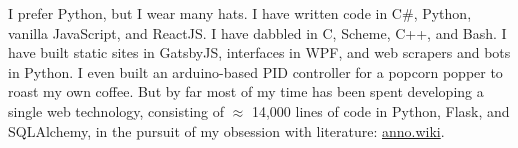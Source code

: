 \documentclass[9pt]{developercv} %
\begin{document}
    I prefer Python, but I wear many hats. I have written code in C\#,
    Python, vanilla JavaScript, and ReactJS. I have dabbled in C, Scheme, C++,
    and Bash. I have built static sites in GatsbyJS, interfaces in WPF, and web
    scrapers and bots in Python. I even built an arduino-based PID controller
    for a popcorn popper to roast my own coffee. But by far most of my time has
    been spent developing a single web technology, consisting of $\approx$
    14,000 lines of code in Python, Flask, and SQLAlchemy, in the pursuit of my
    obsession with literature:
    {\href{https://github.com/malan88/icc}{anno.wiki}}.



\end{document}
